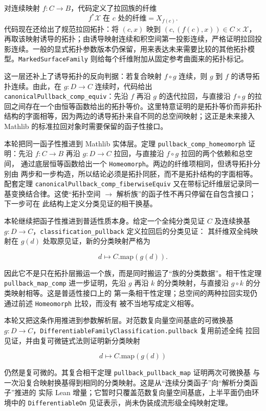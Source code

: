 \documentclass[UTF8,fontset=none,a4paper,11pt]{ctexart}
\begin{document}
对连续映射 $f:C\to B$，代码定义了拉回族的纤维
\[
  f^*\mathcal X\;\text{在 }c\text{ 处的纤维}=X_{f(c)}.
\]
代码现在还给出了规范拉回拓扑：将 $(c,x)$ 映到 $(c,(f(c),x))\in C\times\mathcal X$，再取该映射诱导的拓扑；由诱导映射连续和积空间第一投影连续，严格证明拉回投影连续。一般的显式拓扑参数版本仍保留，用来表达未来需要比较的其他拓扑模型。\texttt{MarkedSurfaceFamily} 则给每个纤维附加从固定参考曲面来的拓扑标记。

这一层还补上了诱导拓扑的反向判据：若复合映射 $f\circ g$ 连续，则 $g$ 到 $f$ 的诱导拓扑连续。由此，在 $g:D\to C$ 连续时，代码给出
\texttt{canonicalPullback\_comp\_equiv}：先沿 $f$ 再沿 $g$ 的迭代拉回，与直接沿 $f\circ g$ 的拉回之间存在一个由恒等函数给出的拓扑等价。这里特意证明的是拓扑等价而非拓扑结构的字面相等，因为两边的诱导拓扑来自不同的总空间映射；这正是未来接入 Mathlib 的标准拉回对象时需要保留的函子性接口。

本轮把同一函子性推进到 Mathlib 实体层。定理
\texttt{pullback\_comp\_homeomorph} 证明：先沿
$f:C\to B$ 再沿 $g:D\to C$ 拉回，与直接沿 $f\circ g$ 拉回的两个依赖和总空间，
通过底层恒等函数给出一个 \texttt{Homeomorph}。两边的纤维项相同，但诱导拓扑分别由
两步和一步构造，所以结论必须是拓扑同胚，而不是拓扑结构的字面相等。
配套定理 \texttt{canonicalPullback\_comp\_fiberwiseEquiv} 又在带标记纤维层记录同一
基变换结合律。这使“拓扑空间 $\to$ 解析族”的函子性不再只停留在自包含接口；下一步可在
此结构上定义分类见证的相干换基。

本轮继续把函子性推进到普适性质本身。给定一个全纯分类见证 $C$ 及连续换基
$g:D\to C$，\texttt{classification\_pullback} 定义拉回后的分类见证：
其纤维双全纯映射在 $g(d)$ 处取原见证，新的分类映射严格为

\[
  d\longmapsto C.\mathrm{map}(g(d)).
\]

因此它不是只在拓扑层搬运一个族，而是同时搬运了“族的分类数据”。相干性定理
\texttt{pullback\_map\_comp} 进一步证明，先沿
$g$ 再沿 $k$ 的分类映射，与直接沿 $g\circ k$ 的分类映射相等。这是普适性接口上的
第一条相干性定理；总空间的两种拉回实现仍通过前述 \texttt{Homeomorph} 比较，而没有
被不当地写成定义相等。

本轮又把这条作用推进到参数解析层。对范数复向量空间基底的可微换基
$g:D\to C$，\texttt{DifferentiableFamilyClassification.pullback} 复用前述全纯
拉回见证，并由复可微链式法则证明新分类映射

\[
  d\longmapsto C.\mathrm{map}(g(d))
\]

仍然是复可微的。其复合相干定理
\texttt{pullback\_pullback\_map} 证明两次可微换基
与一次沿复合映射换基得到相同的分类映射。这是从“连续分类函子”向“解析分类函子”推进的
实际 Lean 增量；它暂时只覆盖范数复向量空间基底，上半平面仍由环境中的
\texttt{DifferentiableOn} 见证表示，尚未伪装成流形级全纯映射定理。
\end{document}
